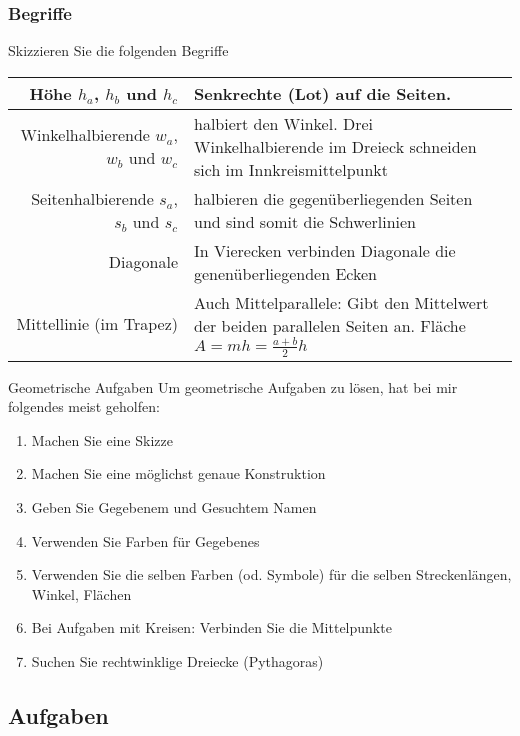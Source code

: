 \newpage
\subsubsection{Begriffe}

Skizzieren Sie die folgenden Begriffe

\begin{tabular}{rp{90mm}}
  Höhe $h_a$, $h_b$ und $h_c$ & Senkrechte (Lot) auf die Seiten.\\\hline
  
  Winkelhalbierende $w_a$, $w_b$ und $w_c$ & halbiert den Winkel. Drei
    Winkelhalbierende im Dreieck schneiden sich im Innkreismittelpunkt\\\hline

    Seitenhalbierende $s_a$, $s_b$ und $s_c$ & halbieren die
  gegenüberliegenden Seiten und sind somit die
  Schwerlinien\index{Schwerlinie}\\\hline
  
  Diagonale & In Vierecken verbinden Diagonale die genenüberliegenden
  Ecken\\\hline

  Mittellinie (im Trapez) & Auch Mittelparallele: Gibt den Mittelwert
  der beiden parallelen Seiten an. Fläche $A = mh = \frac{a+b}2h$
\end{tabular}

\TNTeop{}
\newpage

\begin{rezept}{Geometrische Aufgaben}{}
Um geometrische Aufgaben zu lösen, hat bei mir folgendes meist geholfen:

\begin{enumerate}
\item Machen Sie eine Skizze
\item Machen Sie eine möglichst genaue Konstruktion
\item Geben Sie Gegebenem und Gesuchtem Namen
\item Verwenden Sie Farben für Gegebenes
\item Verwenden Sie die selben Farben (od. Symbole) für die selben Streckenlängen, Winkel, Flächen
\item Bei Aufgaben mit Kreisen: Verbinden Sie die Mittelpunkte 
\item Suchen Sie rechtwinklige Dreiecke (Pythagoras)

\end{enumerate}
\end{rezept}


\subsection*{Aufgaben}

